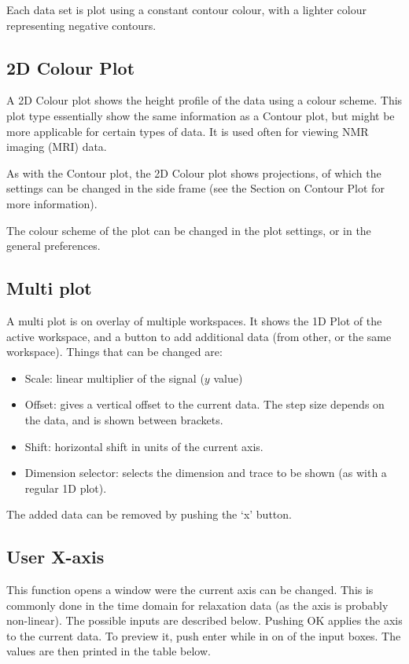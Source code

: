 \documentclass[11pt,a4paper]{article}
\begin{document}
Each data set is plot using a constant contour colour, with a lighter colour representing negative contours.

\subsection{2D Colour Plot}
A 2D Colour plot shows the height profile of the data using a colour scheme.
This plot type essentially show the same information as a Contour plot, but might
be more applicable for certain types of data. It is used often for viewing NMR imaging (MRI) data.

As with the Contour plot, the 2D Colour plot shows projections, of which the settings can be changed in the side frame (see the Section on Contour Plot for more information).

The colour scheme of the plot can be changed in the plot settings, or in the general preferences.

\subsection{Multi plot}
A multi plot is on overlay of multiple workspaces. It shows the 1D Plot of the active workspace, and a button
to add additional data (from other, or the same workspace). Things that can be changed are:
\begin{itemize}
  \item Scale: linear multiplier of the signal ($y$ value)
  \item Offset: gives a vertical offset to the current data. The step size depends on the data, and is shown between
	 brackets.
  \item Shift: horizontal shift in units of the current axis.
  \item Dimension selector: selects the dimension and trace to be shown (as with a regular 1D plot).
\end{itemize}
The added data can be removed by pushing the `x' button.


\subsection{User X-axis}
This function opens a window were the current axis can be changed. This is commonly done in the time domain
for relaxation data (as the axis is probably non-linear). The possible inputs are described below. Pushing OK
applies the axis to the current data. To preview it, push enter while in on of the input boxes. The values are
then printed in the table below.
\end{document}
